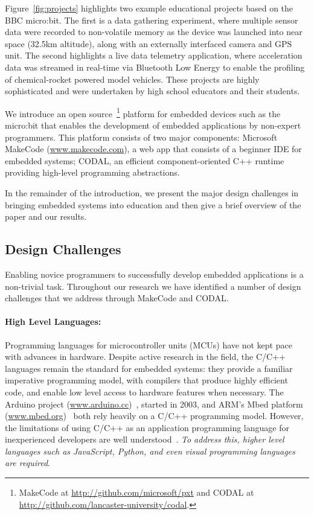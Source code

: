 Figure~\ref{fig:projects} highlights two example educational projects based on the BBC micro:bit. The first is a data gathering experiment, where multiple sensor data were recorded to non-volatile memory as the device was launched into near space (32.5km altitude), along with an externally interfaced camera and GPS unit. The second highlights a live data telemetry application, where acceleration data was streamed in real-time via Bluetooth Low Energy to enable the profiling of chemical-rocket powered model vehicles. These projects are highly sophisticated and were undertaken by high school educators and their students.

We introduce an open source~\footnote{
MakeCode at \url{http://github.com/microsoft/pxt} and CODAL at
\url{http://github.com/lancaster-university/codal}.} platform for embedded devices such as the micro:bit that enables the development of embedded applications by non-expert programmers. This platform consists of two major components: Microsoft MakeCode (\url{www.makecode.com}), a web app that consists of a beginner IDE for embedded
systems; CODAL, an efficient component-oriented C++ runtime 
providing high-level programming abstractions.

In the remainder of the introduction, we present the major design challenges in
bringing embedded systems into education and then give a brief overview of the paper
and our results.

\subsection{Design Challenges}
\label{sec:DesignChallenges}
Enabling novice programmers to successfully develop embedded applications is a non-trivial task. Throughout our research we have identified a number of design challenges that we address through MakeCode and CODAL.

\paragraph{High Level Languages:}
Programming languages for microcontroller units (MCUs) have not kept pace with advances in hardware. Despite active research in the field, the C/C++ languages remain the standard for embedded systems: they provide a familiar imperative programming model, with compilers that produce highly efficient code, and enable low level access to hardware features when necessary. The Arduino project (\url{www.arduino.cc})~\cite{buildingArduino2014}, started in 2003, and ARM's Mbed platform (\url{www.mbed.org})~\cite{ARMmbed} both rely heavily on a C/C++ programming model. However, the limitations of using C/C++ as an application programming language for inexperienced developers are well understood~\cite{blikstein2013gears}. \emph{To address this, higher level languages such as JavaScript, Python, and even visual programming languages are required}.

